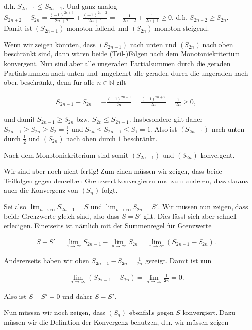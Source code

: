 \documentclass[fontsize=9pt,
               parskip=half-,
               DIV=14,
               listof=chapterentry,
               tocflat]{scrbook}
\begin{document}
d.h. $S_{2n+1}\leq S_{2n-1}$. Und ganz analog $S_{2n+2}-S_{2n}={\frac {(-1)^{2n+3}}{2n+2}}+{\frac {(-1)^{2n+2}}{2n+1}}=-{\frac {1}{2n+2}}+{\frac {1}{2n+1}}\geq 0$, d.h. $S_{2n+2}\geq S_{2n}$. Damit ist $(S_{2n-1})$ monoton fallend und $(S_{2n})$ monoton steigend.

Wenn wir zeigen könnten, dass $(S_{2n-1})$ nach unten und $(S_{2n})$ nach oben beschränkt sind, dann wären beide (Teil-)Folgen nach dem Monotoniekriterium konvergent. Nun sind aber alle ungeraden Partialsummen durch die geraden Partialsummen nach unten und umgekehrt alle geraden durch die ungeraden nach oben beschränkt, denn für alle $n\in \mathbb {N} $ gilt

\begin{align*}
S_{2n-1}-S_{2n}=-{\frac {(-1)^{2n+1}}{2n}}={\frac {(-1)^{2n+2}}{2n}}={\frac {1}{2n}}\geq 0,
\end{align*}

und damit $S_{2n-1}\geq S_{2n}$ bzw. $S_{2n}\leq S_{2n-1}$. Insbesondere gilt daher $S_{2n-1}\geq S_{2n}\geq S_{2}={\frac {1}{2}}$ und $S_{2n}\leq S_{2n-1}\leq S_{1}=1$. Also ist $(S_{2n-1})$ nach unten durch ${\frac {1}{2}}$ und $(S_{2n})$ nach oben durch $1$ beschränkt.

Nach dem Monotoniekriterium sind somit $(S_{2n-1})$ und $(S_{2n})$ konvergent.

Wir sind aber noch nicht fertig! Zum einen müssen wir zeigen, dass beide Teilfolgen gegen denselben Grenzwert konvergieren und zum anderen, dass daraus auch die Konvergenz von $(S_{n})$ folgt.

Sei also $\lim _{n\to \infty }S_{2n-1}=S$ und $\lim _{n\to \infty }S_{2n}=S'$. Wir müssen nun zeigen, dass beide Grenzwerte gleich sind, also dass $S=S'$ gilt. Dies lässt sich aber schnell erledigen. Einerseits ist nämlich mit der Summenregel für Grenzwerte

\begin{align*}
S-S'=\lim _{n\to \infty }S_{2n-1}-\lim _{n\to \infty }S_{2n}=\lim _{n\to \infty }(S_{2n-1}-S_{2n}).
\end{align*}

Andererseits haben wir oben $S_{2n-1}-S_{2n}={\frac {1}{2n}}$ gezeigt. Damit ist nun

\begin{align*}
\lim _{n\to \infty }(S_{2n-1}-S_{2n})=\lim _{n\to \infty }{\frac {1}{2n}}=0.
\end{align*}

Also ist $S-S'=0$ und daher $S=S'$.

Nun müssen wir noch zeigen, dass $(S_{n})$ ebenfalls gegen $S$ konvergiert. Dazu müssen wir die Definition der Konvergenz benutzen, d.h. wir müssen zeigen
\end{document}
